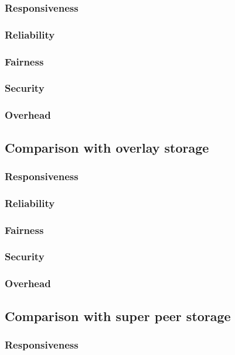                 \subsubsection{Responsiveness}
                \subsubsection{Reliability}
                \subsubsection{Fairness}
                \subsubsection{Security}
                \subsubsection{Overhead}
            \subsection{Comparison with overlay storage}
                \subsubsection{Responsiveness}
                \subsubsection{Reliability}
                \subsubsection{Fairness}
                \subsubsection{Security}
                \subsubsection{Overhead}
            \subsection{Comparison with super peer storage}
                \subsubsection{Responsiveness}
